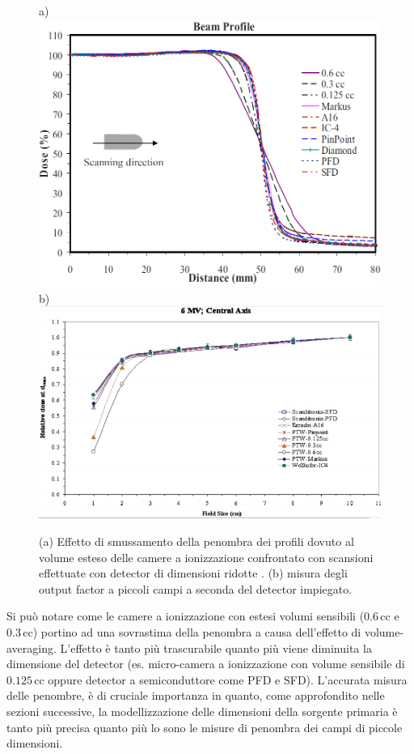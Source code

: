\begin{figure}
\centering
a)\includegraphics[width=.75\textwidth]{./cap2/pen_smear.png}\\
b)\includegraphics[width=.75\textwidth]{./cap2/OF_uncert.png}
\caption{(a) Effetto di smussamento della penombra dei profili dovuto al volume esteso delle camere a ionizzazione confrontato con scansioni effettuate con detector di dimensioni ridotte \cite{Das2008a}. (b) misura degli output factor a piccoli campi a seconda del detector impiegato\cite{Das2008}.}
\label{fig:pen_of}
\end{figure}

Si può notare come le camere a ionizzazione con estesi volumi sensibili ($0.6\,$cc e $0.3\,$cc) portino ad una sovrastima della penombra a causa dell'effetto di volume-averaging. L'effetto è tanto più trascurabile quanto più viene diminuita la dimensione del detector (es. micro-camera a ionizzazione con volume sensibile di $0.125\,$cc oppure detector a semiconduttore come PFD e SFD). L'accurata misura delle penombre, è di cruciale importanza in quanto, come approfondito nelle sezioni successive, la modellizzazione delle dimensioni della sorgente primaria è tanto più precisa quanto più lo sono le misure di penombra dei campi di piccole dimensioni.

